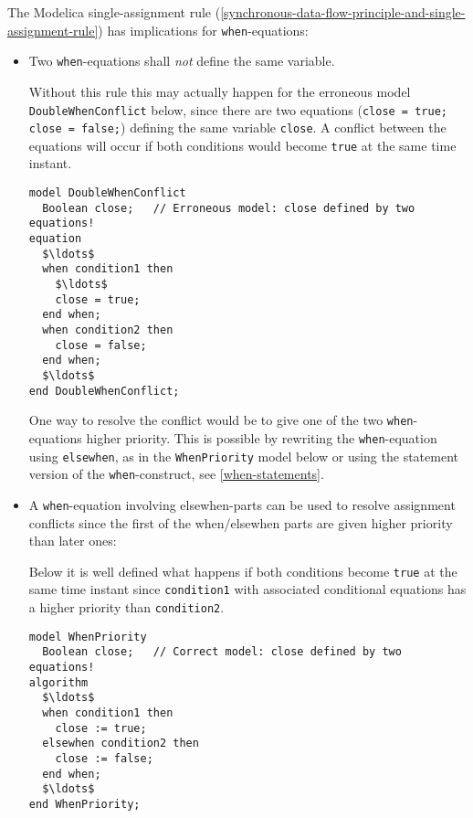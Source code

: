 The Modelica single-assignment rule (\cref{synchronous-data-flow-principle-and-single-assignment-rule}) has implications for \lstinline!when!-equations:
\begin{itemize}
\item
  Two \lstinline!when!-equations shall \emph{not} define the same variable.

\begin{nonnormative}
Without this rule this may actually happen for the erroneous model \lstinline!DoubleWhenConflict! below, since there are two equations (\lstinline!close = true; close = false;!) defining the same variable \lstinline!close!.
A conflict between the equations will occur if both conditions would become \lstinline!true! at the same time instant.
\begin{lstlisting}[language=modelica]
model DoubleWhenConflict
  Boolean close;   // Erroneous model: close defined by two equations!
equation
  $\ldots$
  when condition1 then
    $\ldots$
    close = true;
  end when;
  when condition2 then
    close = false;
  end when;
  $\ldots$
end DoubleWhenConflict;
\end{lstlisting}

One way to resolve the conflict would be to give one of the two \lstinline!when!-equations higher priority.
This is possible by rewriting the \lstinline!when!-equation using \lstinline!elsewhen!, as in the \lstinline!WhenPriority! model below or using the statement version of the \lstinline!when!-construct, see \cref{when-statements}.
\end{nonnormative}

\item
  A \lstinline!when!-equation involving elsewhen-parts can be used to resolve assignment conflicts since the first of the when/elsewhen parts are given higher priority than later ones:
\begin{nonnormative}
Below it is well defined what happens if both conditions become \lstinline!true! at the same time instant since \lstinline!condition1! with associated conditional equations has a higher priority than \lstinline!condition2!.
\begin{lstlisting}[language=modelica]
model WhenPriority
  Boolean close;   // Correct model: close defined by two equations!
algorithm
  $\ldots$
  when condition1 then
    close := true;
  elsewhen condition2 then
    close := false;
  end when;
  $\ldots$
end WhenPriority;
\end{lstlisting}
\end{nonnormative}
\end{itemize}

